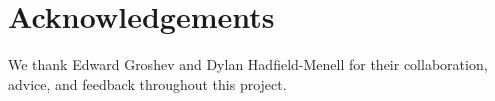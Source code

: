 \section{Acknowledgements}
We thank Edward Groshev and Dylan Hadfield-Menell for their collaboration, advice, and feedback
throughout this project.